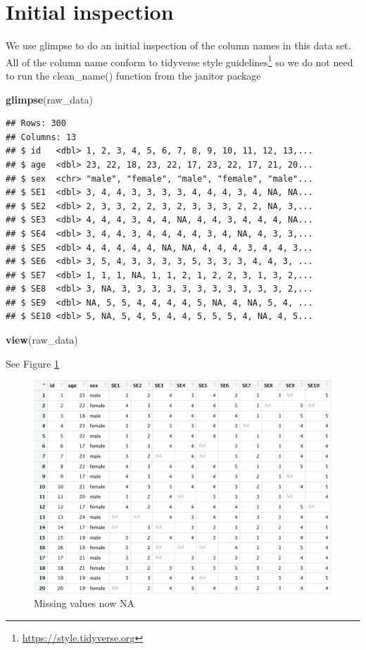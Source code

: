 \documentclass[
]{krantz}
\makeatletter
\newenvironment{Shaded}{\begin{snugshade}}{\end{snugshade}}
\newcommand{\KeywordTok}[1]{\textcolor[rgb]{0.27,0.27,0.27}{\textbf{#1}}}
\newcommand{\NormalTok}[1]{#1}
\renewcommand{\href}[2]{#2\footnote{\url{#1}}}
\newenvironment{kframe}{%
\medskip{}
\setlength{\fboxsep}{.8em}
 \def\at@end@of@kframe{}%
 \ifinner\ifhmode%
  \def\at@end@of@kframe{\end{minipage}}%
  \begin{minipage}{\columnwidth}%
 \fi\fi%
 \def\FrameCommand##1{\hskip\@totalleftmargin \hskip-\fboxsep
 \colorbox{shadecolor}{##1}\hskip-\fboxsep
     \hskip-\linewidth \hskip-\@totalleftmargin \hskip\columnwidth}%
 \MakeFramed {\advance\hsize-\width
   \@totalleftmargin\z@ \linewidth\hsize
   \@setminipage}}%
 {\par\unskip\endMakeFramed%
 \at@end@of@kframe}
\renewenvironment{Shaded}{\begin{kframe}}{\end{kframe}}
\makeatother
\begin{document}
\hypertarget{initial-inspection}{%
\section{Initial inspection}\label{initial-inspection}}

We use glimpse to do an initial inspection of the column names in this data set. All of the column name conform to \href{https://style.tidyverse.org}{tidyverse style guidelines} so we do not need to run the clean\_name() function from the janitor package

\begin{Shaded}
\begin{Highlighting}[]
\KeywordTok{glimpse}\NormalTok{(raw_data)}
\end{Highlighting}
\end{Shaded}

\begin{verbatim}
## Rows: 300
## Columns: 13
## $ id   <dbl> 1, 2, 3, 4, 5, 6, 7, 8, 9, 10, 11, 12, 13,...
## $ age  <dbl> 23, 22, 18, 23, 22, 17, 23, 22, 17, 21, 20...
## $ sex  <chr> "male", "female", "male", "female", "male"...
## $ SE1  <dbl> 3, 4, 4, 3, 3, 3, 3, 4, 4, 4, 3, 4, NA, NA...
## $ SE2  <dbl> 2, 3, 3, 2, 2, 3, 2, 3, 3, 3, 2, 2, NA, 3,...
## $ SE3  <dbl> 4, 4, 4, 3, 4, 4, NA, 4, 4, 3, 4, 4, 4, NA...
## $ SE4  <dbl> 3, 4, 4, 3, 4, 4, 4, 4, 3, 4, NA, 4, 3, 3,...
## $ SE5  <dbl> 4, 4, 4, 4, 4, NA, NA, 4, 4, 4, 3, 4, 4, 3...
## $ SE6  <dbl> 3, 5, 4, 3, 3, 3, 3, 5, 3, 3, 3, 4, 4, 3, ...
## $ SE7  <dbl> 1, 1, 1, NA, 1, 1, 2, 1, 2, 2, 3, 1, 3, 2,...
## $ SE8  <dbl> 3, NA, 3, 3, 3, 3, 3, 3, 3, 3, 3, 3, 3, 2,...
## $ SE9  <dbl> NA, 5, 5, 4, 4, 4, 4, 5, NA, 4, NA, 5, 4, ...
## $ SE10 <dbl> 5, NA, 5, 4, 5, 4, 4, 5, 5, 5, 4, NA, 4, 5...
\end{verbatim}

\begin{Shaded}
\begin{Highlighting}[]
\KeywordTok{view}\NormalTok{(raw_data)}
\end{Highlighting}
\end{Shaded}

See Figure \ref{fig:narawdataitems}

\begin{figure}
\includegraphics[width=0.85\linewidth]{ch_score_items/images/screenshot_raw_data_na} \caption{Missing values now NA}\label{fig:narawdataitems}
\end{figure}
\end{document}
